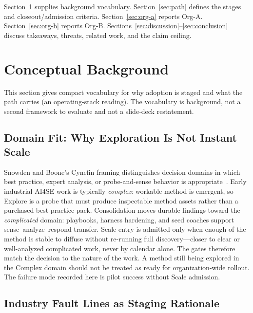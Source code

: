 \documentclass[10pt,conference]{IEEEtran}
\begin{document}
Section~\ref{sec:background} supplies background vocabulary.
Section~\ref{sec:path} defines the stages and closeout/admission criteria.
Section~\ref{sec:org-a} reports Org-A.
Section~\ref{sec:org-b} reports Org-B.
Sections~\ref{sec:discussion}--\ref{sec:conclusion} discuss
takeaways, threats, related work, and the claim ceiling.

\section{Conceptual Background}
\label{sec:background}

This section gives compact vocabulary for why adoption is staged and what the
path carries (an operating-stack reading).
The vocabulary is background, not a second framework to evaluate and not a
slide-deck restatement.

\subsection{Domain Fit: Why Exploration Is Not Instant Scale}
\label{sec:cynefin}

Snowden and Boone's Cynefin framing distinguishes decision domains in which
best practice, expert analysis, or probe-and-sense behavior is
appropriate~\cite{Snowden2007Cynefin}.
Early industrial AI4SE work is typically \emph{complex}: workable method is
emergent, so Explore is a probe that must produce inspectable method assets
rather than a purchased best-practice pack.
Consolidation moves durable findings toward the \emph{complicated} domain:
playbooks, harness hardening, and seed coaches support sense--analyze--respond
transfer.
Scale entry is admitted only when enough of the method is stable to diffuse
without re-running full discovery---closer to clear or well-analyzed
complicated work, never by calendar alone.
The gates therefore match the decision to the nature of the work.  A method
still being explored in the Complex domain should not be treated as ready for
organization-wide rollout.  The failure mode recorded here is pilot success
without Scale admission.

\subsection{Industry Fault Lines as Staging Rationale}
\label{sec:tw-retreats}
\end{document}
